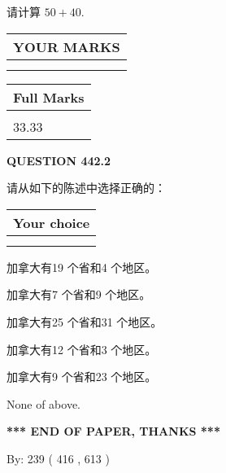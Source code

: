 \documentclass{ctexart}
\begin{document}
  
 
请计算 $ %
50 +  %
40 $.
 

 

 
  
\vspace{0.2in}
  
\noindent\begin{tabular}{|l|}
\hline
 YOUR MARKS  \\
\hline
 \\ 
 \\ 
\hline
\end{tabular}
\hspace{0.05in} \begin{tabular}{|l|}
\hline
 Full Marks  \\
\hline
 \\ 
33.33 \\
\hline
\end{tabular}
{\textbf{\Large{QUESTION
442.2 
}}}
  
  
请从如下的陈述中选择正确的：
  
  
\noindent\hspace{3.0in} \begin{tabular}{|l|}
\hline
Your choice \\
\hline
 \\ 
 \\ 
\hline
\end{tabular}
  
  
 
 
加拿大有19 个省和4 个地区。
 
 
加拿大有7 个省和9 个地区。
 
 
加拿大有25 个省和31 个地区。
 
 
加拿大有12 个省和3 个地区。
 
 
加拿大有9 个省和23 个地区。
 
 
 None of above.
 
 
   
   
 \vspace{0.2in}
 
   
   
   
   
\vspace{1.0in} 
{\textbf{\large{ *** END OF PAPER, THANKS *** }}} 
   
   
\hspace{1.0in} By: 
 239 ( 416 ,  613 )
   
\end{document}
